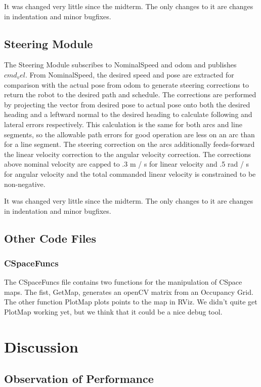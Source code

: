 \documentclass{article}
\begin{document}
It was changed very little since the midterm. The only changes to it are changes in indentation and minor bugfixes.

\subsection{Steering Module}

The Steering Module subscribes to NominalSpeed and odom and publishes $cmd_vel$.
From NominalSpeed, the desired speed and pose are extracted for comparison with the actual pose from odom to generate steering corrections to return the robot to the desired path and schedule.
The corrections are performed by projecting the vector from desired pose to actual pose onto both the desired heading and a leftward normal to the desired heading to calculate following and lateral errors respectively.
This calculation is the same for both arcs and line segments, so the allowable path errors for good operation are less on an arc than for a line segment.
The steering correction on the arcs additionally feeds-forward the linear velocity correction to the angular velocity correction.
The corrections above nominal velocity are capped to .3 m / s for linear velocity and .5 rad / s for angular velocity and the total commanded linear velocity is constrained to be non-negative.

It was changed very little since the midterm. The only changes to it are changes in indentation and minor bugfixes.

\subsection{Other Code Files}
\subsubsection{CSpaceFuncs}
The CSpaceFuncs file contains two functions for the manipulation of CSpace maps.  The fist, GetMap, generates an openCV matrix from an Occupancy Grid.  The other function PlotMap plots points to the map in RViz.  We didn't quite get PlotMap working yet, but we think that it could be a nice debug tool.


\section{Discussion}
\subsection{Observation of Performance}
\end{document}
